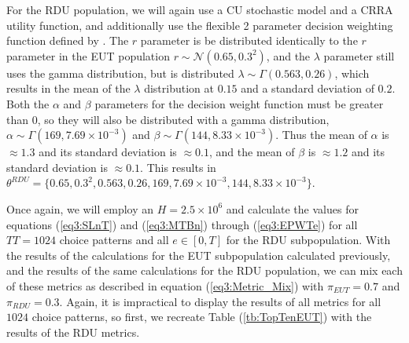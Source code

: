\documentclass[../main.tex]{subfiles}
\begin{document}
For the RDU population, we will again use a CU stochastic model and a CRRA utility function, and additionally use the flexible 2 parameter decision weighting function defined by \textcite{Prelec1998}.
The $r$ parameter is be distributed identically to the $r$ parameter in the EUT population $r \sim \mathcal{N}(0.65 , 0.3^2 )$, and the $\lambda$ parameter still uses the gamma distribution, but is distributed $\lambda \sim \Gamma(0.563 , 0.26)$, which results in the mean of the $\lambda$ distribution at $0.15$ and a standard deviation of $0.2$.{\footnotemark}
Both the $\alpha$ and $\beta$ parameters for the decision weight function must be greater than $0$, so they will also be distributed with a gamma distribution, $\alpha \sim \Gamma(169 , 7.69 \times 10^{-3})$ and $\beta \sim \Gamma(144 , 8.33 \times 10^{-3})$.
Thus the mean of $\alpha$ is $\approx 1.3$ and its standard deviation is $\approx 0.1$, and the mean of $\beta$ is $\approx 1.2$ and its standard deviation is $\approx 0.1$.
This results in $\theta^{RDU} = \lbrace  0.65 ,0.3^2,  0.563 , 0.26 , 169 , 7.69 \times 10^{-3} , 144 , 8.33 \times 10^{-3} \rbrace$.

\addtocounter{footnote}{-1}

Once again, we will employ an $H = 2.5 \times 10^6$ and calculate the values for equations (\ref{eq3:SLnT}) and (\ref{eq3:MTBn}) through (\ref{eq3:EPWTe}) for all $\mathit{TT} =1024$ choice patterns and all $e \in[0,T]$ for the RDU subpopulation.
With the results of the calculations for the EUT subpopulation calculated previously, and the results of the same calculations for the RDU population, we can mix each of these metrics as described in equation (\ref{eq3:Metric_Mix}) with $\pi_{EUT} = 0.7$ and $\pi_{RDU} = 0.3$.
Again, it is impractical to display the results of all metrics for all $1024$ choice patterns, so first, we recreate Table (\ref{tb:TopTenEUT}) with the results of the RDU metrics.
\end{document}
